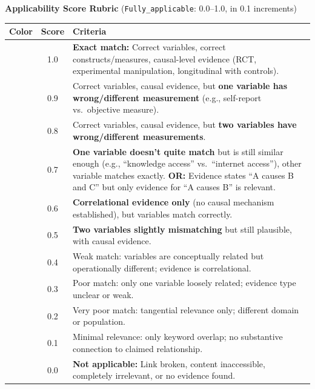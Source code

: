 \begin{table}[htbp]
\vspace{1.5em}

\textbf{Applicability Score Rubric} (\texttt{Fully\_applicable}: 0.0--1.0, in 0.1 increments)

\vspace{0.5em}

\begin{tabular}{|>{\columncolor{green!70!black}\color{white}}c|c|p{9.5cm}|}
\hline
\textbf{Color} & \textbf{Score} & \textbf{Criteria} \\
\hline
\cellcolor{green!70!black}\textcolor{white}{} & 1.0 & \textbf{Exact match:} Correct variables, correct constructs/measures, causal-level evidence (RCT, experimental manipulation, longitudinal with controls). \\
\hline
\cellcolor{green!60} & 0.9 & Correct variables, causal evidence, but \textbf{one variable has wrong/different measurement} (e.g., self-report vs.\ objective measure). \\
\hline
\cellcolor{green!50} & 0.8 & Correct variables, causal evidence, but \textbf{two variables have wrong/different measurements}. \\
\hline
\cellcolor{yellow!70} & 0.7 & \textbf{One variable doesn't quite match} but is still similar enough (e.g., ``knowledge access'' vs.\ ``internet access''), other variable matches exactly. \textbf{OR:} Evidence states ``A causes B and C'' but only evidence for ``A causes B'' is relevant. \\
\hline
\cellcolor{yellow!50} & 0.6 & \textbf{Correlational evidence only} (no causal mechanism established), but variables match correctly. \\
\hline
\cellcolor{orange!50} & 0.5 & \textbf{Two variables slightly mismatching} but still plausible, with causal evidence. \\
\hline
\cellcolor{orange!70} & 0.4 & Weak match: variables are conceptually related but operationally different; evidence is correlational. \\
\hline
\cellcolor{red!50} & 0.3 & Poor match: only one variable loosely related; evidence type unclear or weak. \\
\hline
\cellcolor{red!70} & 0.2 & Very poor match: tangential relevance only; different domain or population. \\
\hline
\cellcolor{red!90}\textcolor{white}{} & 0.1 & Minimal relevance: only keyword overlap; no substantive connection to claimed relationship. \\
\hline
\cellcolor{gray!70} & 0.0 & \textbf{Not applicable:} Link broken, content inaccessible, completely irrelevant, or no evidence found. \\
\hline
\end{tabular}

\end{table}




